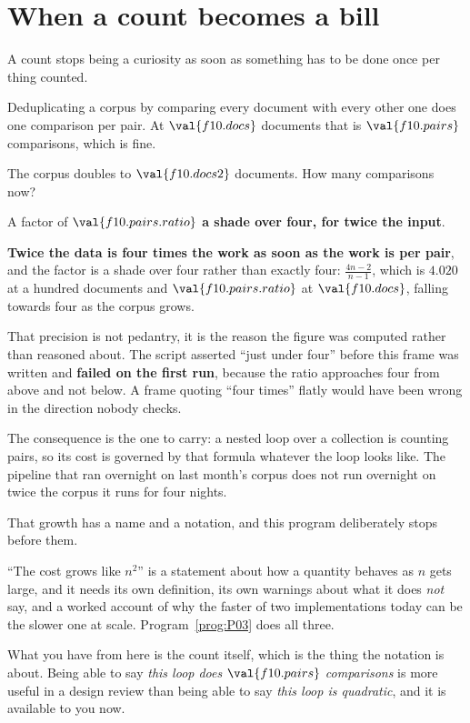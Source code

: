 \section{When a count becomes a bill}
\label{sec:F10-cost}

\begin{fr}
A count stops being a curiosity as soon as something has to be done once per
thing counted.

Deduplicating a corpus by comparing every document with every other one does
one comparison per pair. At $\val{f10.docs}$ documents that is
$\val{f10.pairs}$ comparisons, which is fine.

The corpus doubles to $\val{f10.docs2}$ documents. How many comparisons now?
\dotline
\nextframe
\end{fr}

\begin{fr}
A factor of $\val{f10.pairs.ratio}$ \dash{} \textbf{a shade over four, for
twice the input}.

\begin{trapbox}
\textbf{Twice the data is four times the work as soon as the work is per
pair}, and the factor is a shade over four rather than exactly four:
$\frac{4n-2}{n-1}$, which is $\num{4.020}$ at a hundred documents and
$\val{f10.pairs.ratio}$ at $\val{f10.docs}$, falling towards four as the
corpus grows.

That precision is not pedantry, it is the reason the figure was computed
rather than reasoned about. The script asserted \enquote{just under four}
before this frame was written and \textbf{failed on the first run}, because
the ratio approaches four from above and not below. A frame quoting
\enquote{four times} flatly would have been wrong in the direction nobody
checks.

The consequence is the one to carry: a nested loop over a collection is
counting pairs, so its cost is governed by that formula whatever the loop
looks like. The pipeline that ran overnight on last month's corpus does not
run overnight on twice the corpus \dash{} it runs for four nights.
\end{trapbox}
\end{fr}

\begin{fr}
That growth has a name and a notation, and this program deliberately stops
before them.

\enquote{The cost grows like $n^{2}$} is a statement about how a quantity
behaves as $n$ gets large, and it needs its own definition, its own warnings
about what it does \emph{not} say, and a worked account of why the faster of
two implementations today can be the slower one at scale.
Program~\ref{prog:P03} does all three.

What you have from here is the count itself, which is the thing the notation
is about. Being able to say \emph{this loop does $\val{f10.pairs}$
comparisons} is more useful in a design review than being able to say
\emph{this loop is quadratic}, and it is available to you now.
\end{fr}


